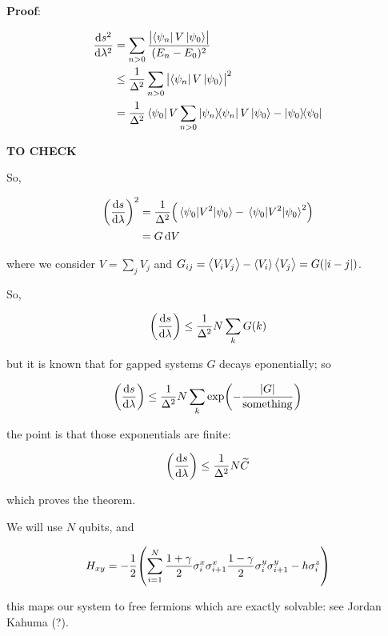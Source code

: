 \begin{greenbox}
  \textbf{Proof}:

  \begin{subequations}
  \begin{align}
    \dv{s^2}{\lambda^2}  &= \sum _{n>0}  \frac{\abs{\bra{\psi_n} V \ket{\psi_0}}}{(E_n - E_0)^2}  \\
    &\leq \frac{1}{\Delta^2} \sum _{n>0} \abs{\bra{\psi_n} V \ket{\psi_0}}^2  \\
    &=  \frac{1}{\Delta^2} \bra{\psi_0} V   \sum _{n>0} \dyad{\psi_n} V \ket{\psi_0}
      - \ketbra{\psi_0}{\psi_0}
  \end{align}
  \end{subequations}

  \textbf{TO CHECK}

  So,

  \begin{subequations}
  \begin{align}
    \qty(\dv{s}{\lambda})^2  &=  \frac{1}{\Delta^2} \qty(\ev{V^2}{\psi_0} - \ev{V^2}{\psi_0}^2)  \\
    &= G \dd{V}
  \end{align}
  \end{subequations}

  where we consider \(V = \sum _{j}  V_j \) and \(G _{ij} = \expval{V_i V_j} - \expval{V_i} \expval{V_j} = G(\abs{i-j} ) \).

  So,

  \begin{equation}
    \qty(\dv{s}{\lambda} ) \leq \frac{1}{\Delta^2} N \sum _{k} G(k)
  \end{equation}

  but it is known that for gapped systems \(G\) decays eponentially; so

  \begin{equation}
    \qty(\dv{s}{\lambda} ) \leq \frac{1}{\Delta^2} N \sum _{k} \exp(-\frac{\abs{G}}{\text{something}}  )
  \end{equation} 

  the point is that those exponentials are finite:

  \begin{equation}
    \qty(\dv{s}{\lambda} ) \leq \frac{1}{\Delta^2} N \widetilde{C}
  \end{equation}

  which proves the theorem.
\end{greenbox}

We will use \(N\) qubits, and

\begin{equation}
  H_{xy} = -\frac{1}{2} \qty(\sum _{i=1}   ^{N} \frac{1 + \gamma}{2} \sigma_i ^x \sigma_{i+1}^x \frac{1-\gamma}{2} \sigma^y_i \sigma_{i+1}^y - h \sigma_i^{z} )
\end{equation}

this maps our system to free fermions which are exactly solvable: see Jordan Kahuma (?).
